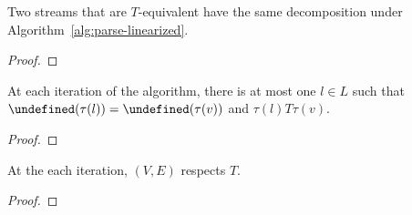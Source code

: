 \documentclass[12pt]{article}
\let\depth\undefined
\newcommand{\depth}{\mathbf{depth}}
\begin{document}
\begin{lemma}
  Two streams that are \(T\)-equivalent have the same decomposition
  under Algorithm~\ref{alg:parse-linearized}.
\end{lemma}
\begin{proof}
\end{proof}


\begin{lemma}
  At each iteration of the algorithm,
  there is at most one \(l \in L\) such that
  \(\depth(\tau(l)) = \depth(\tau(v))\)
  and \(\tau(l) T \tau(v)\).
\end{lemma}
\begin{proof}
\end{proof}

\begin{lemma}
  At the each iteration, \((V, E)\) respects \(T\).
\end{lemma}
\begin{proof}
\end{proof}

\printbibliography
\end{document}
